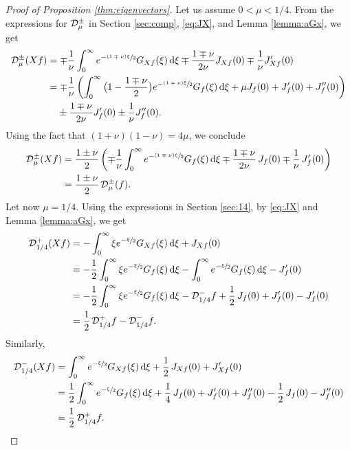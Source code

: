 \documentclass[10pt]{amsart}
\newcommand{\tpsfrac}[3]{\sfrac{(#1)#3}{#2}}
\newcommand*{\diff}{\mathop{}\!\mathrm{d}}
\newcommand{\Dpm}[1]{\mathcal{D}_\mu^{\pm} #1}
\newcommand{\Dpmp}[1]{\mathcal{D}_\mu^{\pm}(#1)}
\theoremstyle{definition}
\begin{document}
\begin{proof}[{Proof of Proposition \ref{thm:eigenvectors}}]
Let us assume $0<\mu< 1/4$. From the expressions for $\Dpm$ in Section \ref{sec:comp}, \eqref{eq:JX}, and Lemma \ref{lemma:aGx}, we get
\begin{equation*}
\begin{split}
\Dpmp{Xf} &= \mp \frac{1}{\nu} \int_0^\infty e^{-\tpsfrac{1 \mp \nu}{2}\xi} G_{Xf}(\xi) \diff \xi \mp \frac{1 \mp \nu}{2\nu} J_{Xf}(0) \mp \frac{1}{\nu} J'_{Xf}(0)\\
&= \mp \frac{1}{\nu} \left(\int_0^\infty \big(1 -\frac{1 \mp \nu}{2}\big) e^{-\tpsfrac{1 \mp \nu}{2}\xi} G_f(\xi) \diff \xi + \mu J_f(0) + J_f'(0) + J_f''(0) \right) \\
&\hphantom{{}=} \pm \frac{1 \mp \nu}{2\nu} J'_f(0) \pm \frac{1}{\nu} J''_f(0).
\end{split}
\end{equation*}
Using the fact that $(1+\nu)(1-\nu) = 4 \mu$, we conclude
\begin{align*}
\Dpmp{Xf} &= \frac{1 \pm \nu}{2} \left(\mp \frac{1}{\nu} \int_0^\infty e^{-\tpsfrac{1 \mp \nu}{2}\xi} G_f(\xi) \diff \xi \mp \frac{1 \mp \nu}{2\nu} \,J_f(0) \mp \frac{1}{\nu}\, J_f'(0) \right)\\
& = \frac{1 \pm \nu}{2}\, \Dpmp{f}.
\end{align*}
Let now $\mu = 1/4$. Using the expressions in Section \ref{sec:14}, by \eqref{eq:JX} and Lemma \ref{lemma:aGx}, we get
\begin{align*}
\mathcal{D}_{1/4}^{+}(Xf) &= - \int_0^\infty \xi e^{-\sfrac{\xi}{2}} G_{Xf}(\xi) \diff \xi + J_{Xf}(0)\\
&=- \frac{1}{2} \int_0^\infty \xi e^{-\sfrac{\xi}{2}} G_{f}(\xi) \diff \xi -\int_0^\infty e^{-\sfrac{\xi}{2}} G_{f}(\xi) \diff \xi -J_f'(0) \\
&=- \frac{1}{2} \int_0^\infty \xi e^{-\sfrac{\xi}{2}} G_{f}(\xi) \diff \xi -\mathcal{D}_{1/4}^{-}f +\frac{1}{2}\,J_f(0) + J_f'(0) -J_f'(0)\\
& = \frac{1}{2}\, \mathcal{D}_{1/4}^{+}f - \mathcal{D}_{1/4}^{-}f .
\end{align*}
Similarly,
\begin{align*}
\mathcal{D}_{1/4}^{-}(Xf) &= \int_0^\infty e^{-\sfrac{\xi}{2}} G_{Xf}(\xi) \diff \xi + \frac{1}{2}\, J_{Xf}(0) + J_{Xf}'(0)\\
&=\frac{1}{2}\int_0^\infty e^{-\sfrac{\xi}{2}} G_{f}(\xi) \diff \xi + \frac{1}{4}\, J_f(0) + J'_f(0) + J_f''(0) - \frac{1}{2}\,J_{f}(0) - J_{f}''(0)\\
& = \frac{1}{2}\, \mathcal{D}_{1/4}^{+}f.
\end{align*}


\end{proof}
\end{document}
